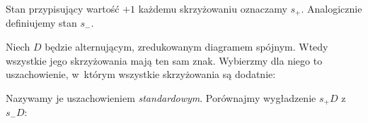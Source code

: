 \begin{definition}
    Stan przypisujący wartość $+1$ każdemu skrzyżowaniu oznaczamy $s_+$.
    Analogicznie definiujemy stan $s_-$.
\end{definition}

Niech $D$ będzie alternującym, zredukowanym diagramem spójnym.
Wtedy wszystkie jego skrzyżowania mają ten sam znak.
Wybierzmy dla niego to uszachowienie, w~którym wszystkie skrzyżowania są dodatnie:
\begin{comment}
\[
    \begin{tikzpicture}[baseline=-0.65ex,scale=0.15]
    \begin{knot}[clip width=5]
        \strand[semithick] (-25, 0) to (25, 0);
        \strand[semithick] (10*0-15, -5) to (10*0-15, 5);
        \strand[semithick] (10*1-15, -5) to (10*1-15, 5);
        \strand[semithick] (10*2-15, -5) to (10*2-15, 5);
        \strand[semithick] (10*3-15, -5) to (10*3-15, 5);
        \draw[fill=blue!10!white,draw=none] (-25, 0) rectangle (-15, -5);
        \draw[fill=blue!10!white,draw=none] (-15, 0) rectangle (-5, 5);
        \draw[fill=blue!10!white,draw=none] (-5, 0) rectangle (5, -5);
        \draw[fill=blue!10!white,draw=none] (5, 0) rectangle (15, 5);
        \draw[fill=blue!10!white,draw=none] (15, 0) rectangle (25, -5);
        \node[above left] at (-15, 0) {$+1$};
        \node[above left] at (5, 0) {$+1$};
        \node[below left] at (-5, 0) {$+1$};
        \node[below left] at (15, 0) {$+1$};
    \end{knot}
    \end{tikzpicture}
\]
\end{comment}
Nazywamy je uszachowieniem \emph{standardowym}.
Porównajmy wygładzenie $s_+D$ z~$s_-D$:
